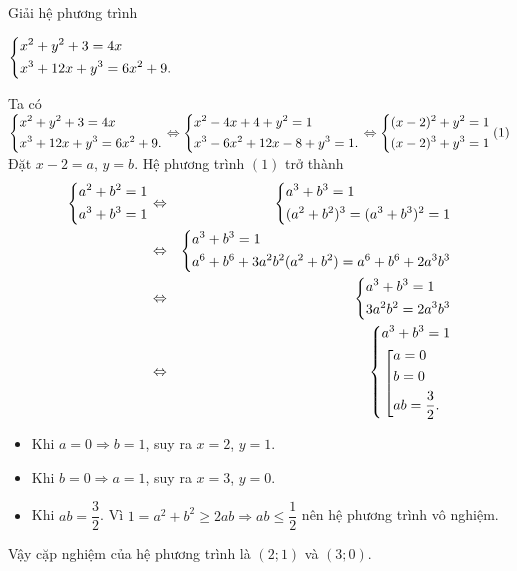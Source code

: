 \begin{ex}%
	Giải hệ phương trình
	\begin{center}
		$\left\{\begin{aligned}&x^2+y^2+3=4x\\&x^3+12x+y^3=6x^2+9.\end{aligned}\right.$
	\end{center}
	\loigiai
	{
		Ta có $\heva{&x^2+y^2+3=4x\\&x^3+12x+y^3=6x^2+9.}\Leftrightarrow \heva{&x^2-4x+4+y^2=1\\&x^3-6x^2+12x-8+y^3=1.}\Leftrightarrow \heva{&(x-2)^2+y^2=1\\&(x-2)^3+y^3=1}\hfill(1)$\\
		Đặt $x-2=a$, $y=b$. Hệ phương trình $(1)$ trở thành
		\begingroup
		\allowdisplaybreaks
		\begin{eqnarray*}
			\left\{\begin{aligned}&a^2+b^2=1\\&a^3+b^3=1\end{aligned}\right.&\Leftrightarrow & \left\{\begin{aligned}&a^3+b^3=1\\&(a^2+b^2)^3=(a^3+b^3)^2=1\end{aligned}\right.\\
			&\Leftrightarrow &\left\{\begin{aligned}&a^3+b^3=1\\&a^6+b^6+3a^2b^2(a^2+b^2)=a^6+b^6+2a^3b^3\end{aligned}\right.\\
			&\Leftrightarrow &\left\{\begin{aligned}&a^3+b^3=1\\&3a^2b^2=2a^3b^3\end{aligned}\right.\\
			&\Leftrightarrow &\left\{\begin{aligned}&a^3+b^3=1 \\&\left[\begin{aligned}&a=0\\&b=0\\&ab=\dfrac{3}{2}.\end{aligned}\right.\end{aligned}\right.
		\end{eqnarray*}
		\endgroup
	\begin{itemize}
		\item Khi $a=0\Rightarrow b=1$, suy ra $x=2$, $y=1$.
		\item Khi $b=0\Rightarrow a=1$, suy ra $x=3$, $y=0$.
		\item Khi $ab=\dfrac{3}{2}$. Vì $1=a^2+b^2\ge 2ab\Rightarrow ab\le \dfrac{1}{2}$ nên hệ phương trình vô nghiệm.
	\end{itemize}
	Vậy cặp nghiệm của hệ phương trình là $(2;1)$ và $(3;0)$.
	}
\end{ex}

